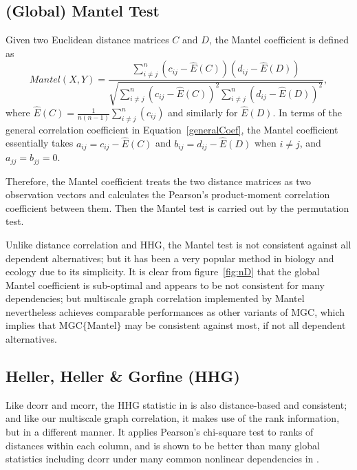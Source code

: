 \documentclass[11pt]{article}
\begin{document}
\subsection{(Global) Mantel Test}
\label{appen:mantel}
Given two Euclidean distance matrices $C$ and $D$, the Mantel coefficient \cite{Mantel1967} is defined as 
\begin{equation}
Mantel(X,Y)=\frac{\sum_{i \neq j}^{n}(c_{ij}-\hat{E}(C))(d_{ij}-\hat{E}(D))}{\sqrt{\sum_{i \neq j}^{n}(c_{ij}-\hat{E}(C))^2 \sum_{i \neq j}^{n}(d_{ij}-\hat{E}(D))^2}},
\end{equation}
where $\hat{E}(C)=\frac{1}{n(n-1)}\sum_{i \neq j}^{n}(c_{ij})$ and similarly for $\hat{E}(D)$. In terms of the general correlation coefficient in Equation~\ref{generalCoef}, the Mantel coefficient essentially takes $a_{ij}=c_{ij}-\hat{E}(C)$ and $b_{ij}=d_{ij}-\hat{E}(D)$ when $i \neq j$, and $a_{jj}=b_{jj}=0$.

Therefore, the Mantel coefficient treats the two distance matrices as two observation vectors and calculates the Pearson's product-moment correlation coefficient between them. Then the Mantel test is carried out by the permutation test.

Unlike distance correlation and HHG, the Mantel test is not consistent against all dependent alternatives; but it has been a very popular method in biology and ecology due to its simplicity. It is clear from figure~\ref{fig:nD} that the global Mantel coefficient is sub-optimal and appears to be not consistent for many dependencies; but multiscale graph correlation implemented by Mantel nevertheless achieves comparable performances as other variants of MGC, which implies that MGC$\{$Mantel$\}$ may be consistent against most, if not all dependent alternatives.

\subsection{Heller, Heller \& Gorfine (HHG)}
\label{appen:hhg}
Like dcorr and mcorr, the HHG statistic in \cite{HellerGorfine2013} is also distance-based and consistent; and like our multiscale graph correlation, it makes use of the rank information, but in a different manner. It applies Pearson's chi-square test to ranks of distances within each column, and is shown to be better than many global statistics including dcorr under many common nonlinear dependencies in \cite{GorfineHellerHeller2012, HellerGorfine2013}. 
\end{document}
